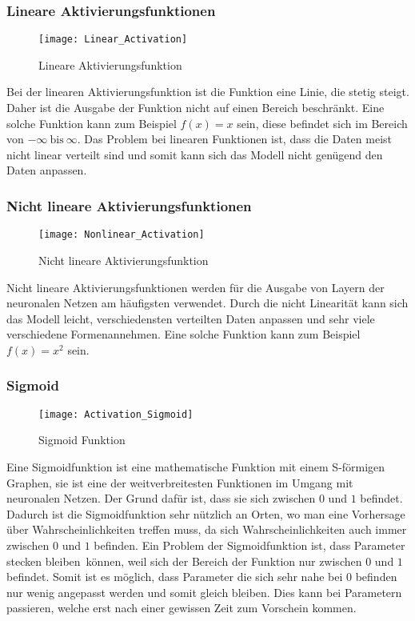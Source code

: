 \subsubsection{Lineare Aktivierungsfunktionen}
\label{sub:linear-activation}
\begin{figure}[H]
	\centering
	\texttt{[image: Linear\_Activation]}
	\caption{Lineare Aktivierungsfunktion}
	\label{fig:Linear-Activation}
\end{figure}
\noindent
Bei der linearen Aktivierungsfunktion ist die Funktion eine Linie, die stetig steigt. Daher ist die Ausgabe der Funktion
nicht auf einen Bereich beschränkt. Eine solche Funktion kann zum Beispiel $f(x) = x$ sein, diese befindet sich im
Bereich von $-\infty \ \text{bis} \ \infty$. Das Problem bei linearen Funktionen ist, dass die Daten meist nicht linear
verteilt sind und somit kann sich das Modell nicht genügend den Daten anpassen.

\subsubsection{Nicht lineare Aktivierungsfunktionen}
\label{sub:nonlinear-activation}
\begin{figure}[H]
	\centering
	\texttt{[image: Nonlinear\_Activation]}
	\caption{Nicht lineare Aktivierungsfunktion}
	\label{fig:Nonlinear-Activation}
\end{figure}
\noindent
Nicht lineare Aktivierungsfunktionen werden für die Ausgabe von Layern der neuronalen Netzen am häufigsten verwendet.
Durch die nicht Linearität kann sich das Modell leicht, verschiedensten verteilten Daten anpassen und sehr viele
verschiedene \flqq Formen\frqq annehmen. Eine solche Funktion kann zum Beispiel $f(x) = x^2$ sein.

\subsubsection{Sigmoid}
\label{sub:activation-sigmoid}
\begin{figure}[H]
	\centering
	\texttt{[image: Activation\_Sigmoid]}
	\caption{Sigmoid Funktion}
	\label{fig:Activation-Sigmoid}
\end{figure}
\noindent
Eine Sigmoidfunktion ist eine mathematische Funktion mit einem S-förmigen Graphen, sie ist eine der weitverbreitesten
Funktionen im Umgang mit neuronalen Netzen. Der Grund dafür ist, dass sie sich zwischen $0$ und $1$ befindet. Dadurch
ist die Sigmoidfunktion sehr nützlich an Orten, wo man eine Vorhersage über Wahrscheinlichkeiten treffen muss, da sich
Wahrscheinlichkeiten auch immer zwischen $0$ und $1$ befinden.
\newline
Ein Problem der Sigmoidfunktion ist, dass Parameter \flqq stecken bleiben\frqq \ können, weil sich der Bereich der
Funktion nur zwischen $0$ und $1$ befindet. Somit ist es möglich, dass Parameter die sich sehr nahe bei $0$ befinden nur
wenig angepasst werden und somit gleich bleiben. Dies kann bei Parametern passieren, welche erst nach einer gewissen
Zeit zum Vorschein kommen.

